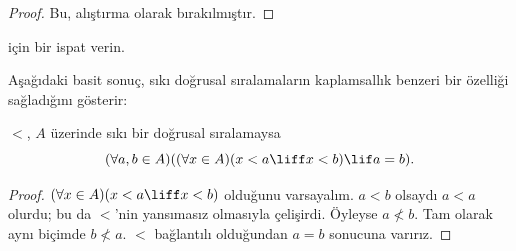 \begin{proof}
Bu, alıştırma olarak bırakılmıştır.
\end{proof}

\begin{prob}
 için bir ispat verin.
\end{prob}

Aşağıdaki basit sonuç, sıkı doğrusal sıralamaların kaplamsallık benzeri bir
özelliği sağladığını gösterir:

\begin{prop}
$<$, $A$ üzerinde sıkı bir doğrusal sıralamaysa
\[
  (\forall a, b \in A)((\forall x \in A)(x < a \liff x < b) \lif a = b).
\]
\end{prop}

\begin{proof}
$(\forall x \in A)(x<a\liff x<b)$ olduğunu varsayalım. $a<b$ olsaydı
$a<a$ olurdu; bu da $<$'nin yansımasız olmasıyla çelişirdi. Öyleyse
$a\nless b$. Tam olarak aynı biçimde $b\nless a$. $<$ bağlantılı olduğundan
$a=b$ sonucuna varırız.
\end{proof}

